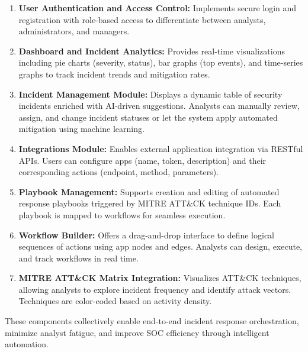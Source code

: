 \begin{enumerate}
    \item \textbf{User Authentication and Access Control:} 
    Implements secure login and registration with role-based access to differentiate between analysts, administrators, and managers.

    \item \textbf{Dashboard and Incident Analytics:} 
    Provides real-time visualizations including pie charts (severity, status), bar graphs (top events), and time-series graphs to track incident trends and mitigation rates.

    \item \textbf{Incident Management Module:} 
    Displays a dynamic table of security incidents enriched with AI-driven suggestions. Analysts can manually review, assign, and change incident statuses or let the system apply automated mitigation using machine learning.

    \item \textbf{Integrations Module:} 
    Enables external application integration via RESTful APIs. Users can configure apps (name, token, description) and their corresponding actions (endpoint, method, parameters).

    \item \textbf{Playbook Management:} 
    Supports creation and editing of automated response playbooks triggered by MITRE ATT\&CK technique IDs. Each playbook is mapped to workflows for seamless execution.

    \item \textbf{Workflow Builder:} 
    Offers a drag-and-drop interface to define logical sequences of actions using app nodes and edges. Analysts can design, execute, and track workflows in real time.

    \item \textbf{MITRE ATT\&CK Matrix Integration:} 
    Visualizes ATT\&CK techniques, allowing analysts to explore incident frequency and identify attack vectors. Techniques are color-coded based on activity density.

\end{enumerate}

These components collectively enable end-to-end incident response orchestration, minimize analyst fatigue, and improve SOC efficiency through intelligent automation.
